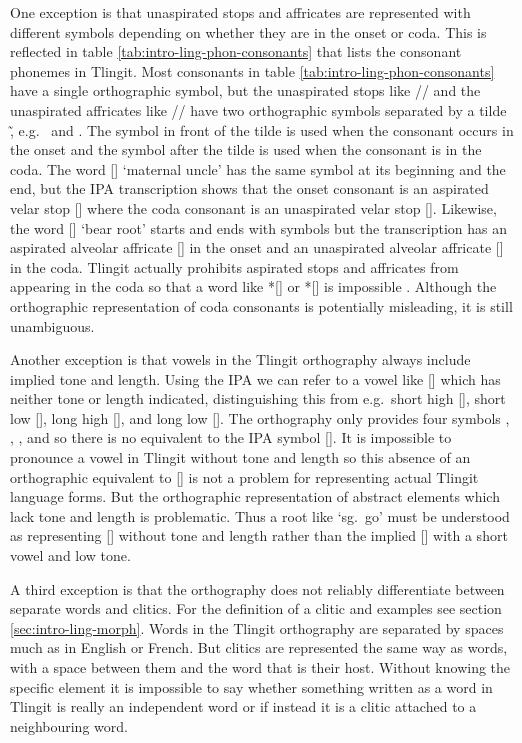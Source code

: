 One exception is that unaspirated stops and affricates are represented with different symbols depending on whether they are in the onset or coda. This is reflected in table \ref{tab:intro-ling-phon-consonants} that lists the consonant phonemes in Tlingit. Most consonants in table \ref{tab:intro-ling-phon-consonants} have a single orthographic symbol, but the unaspirated stops like // and the unaspirated affricates like // have two orthographic symbols separated by a tilde \~, e.g.\  and . The symbol in front of the tilde is used when the consonant occurs in the onset and the symbol after the tilde is used when the consonant is in the coda. The word  [] ‘maternal uncle’ has the same symbol  at its beginning and the end, but the IPA transcription shows that the onset consonant is an aspirated velar stop [] where the coda consonant is an unaspirated velar stop []. Likewise, the word  [] ‘bear root’ starts and ends with  symbols but the transcription has an aspirated alveolar affricate [] in the onset and an unaspirated alveolar affricate [] in the coda. Tlingit actually prohibits aspirated stops and affricates from appearing in the coda so that a word like *[] or *[] is impossible \parencite{maddieson:2001}. Although the orthographic representation of coda consonants is potentially misleading, it is still unambiguous.

Another exception is that vowels in the Tlingit orthography always include implied tone and length. Using the IPA we can refer to a vowel like [] which has neither tone or length indicated, distinguishing this from e.g.\ short high [], short low [], long high [], and long low []. The orthography only provides four symbols , , , and  so there is no equivalent to the IPA symbol []. It is impossible to pronounce a vowel in Tlingit without tone and length so this absence of an orthographic equivalent to [] is not a problem for representing actual Tlingit language forms. But the orthographic representation of abstract elements which lack tone and length is problematic. Thus a root like  ‘sg.\ go’ must be understood as representing [] without tone and length rather than the implied [] with a short vowel and low tone.

A third exception is that the orthography does not reliably differentiate between separate words and clitics. For the definition of a clitic and examples see section \ref{sec:intro-ling-morph}. Words in the Tlingit orthography are separated by spaces much as in English or French. But clitics are represented the same way as words, with a space between them and the word that is their host. Without knowing the specific element it is impossible to say whether something written as a word in Tlingit is really an independent word or if instead it is a clitic attached to a neighbouring word.

